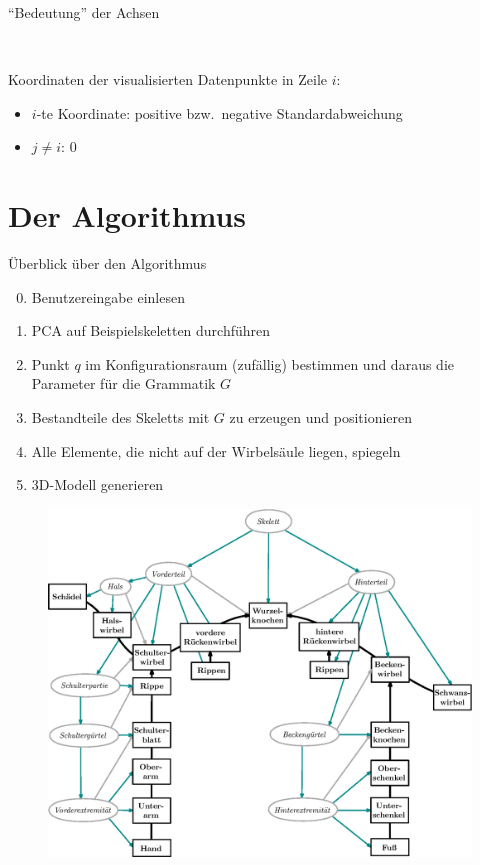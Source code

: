 \documentclass{beamer}
\newcommand{\bzw}{bzw.\ }
\begin{document}
\begin{frame}{"`Bedeutung"' der Achsen}
\begin{minipage}{0.6\textwidth}
\begin{figure}
  \end{figure}
 \end{minipage}~
 \begin{minipage}{0.4\textwidth}
  Koordinaten der visualisierten Datenpunkte in Zeile $i$:
  \begin{itemize}
   \item $i$-te Koordinate: positive \bzw negative Standardabweichung
   \item $j \neq i$: $0$
  \end{itemize}
 \end{minipage}
\end{frame}

\section{Der Algorithmus}
\begin{frame}{Überblick über den Algorithmus}
 \begin{enumerate}
  \setcounter{enumi}{-1}
  \item Benutzereingabe einlesen
  \item PCA auf Beispielskeletten durchführen
  \item Punkt $q$ im Konfigurationsraum (zufällig) bestimmen und daraus die Parameter für die Grammatik $G$
  \item Bestandteile des Skeletts mit $G$ zu erzeugen und positionieren
  \item Alle Elemente, die nicht auf der Wirbelsäule liegen, spiegeln
  \item 3D-Modell generieren
 \end{enumerate}
\end{frame}

\begin{frame}
  \begin{figure}
   \includegraphics[height=0.9\textheight]{../graphics/grammarGraph_withoutLegend}
  \end{figure}
\end{frame}
\end{document}
